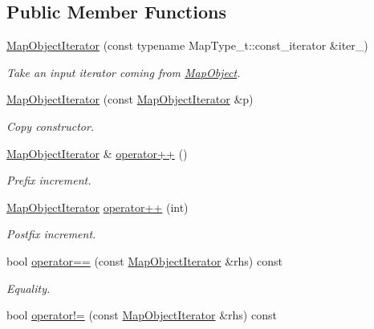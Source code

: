 \subsection*{Public Member Functions}
\begin{DoxyCompactItemize}
\item 
\mbox{\hyperlink{classADAT_1_1MapObjectIterator_a2b23220f6791a2793bb16a898a515926}{Map\+Object\+Iterator}} (const typename Map\+Type\+\_\+t\+::const\+\_\+iterator \&iter\+\_\+)
\begin{DoxyCompactList}\small\item\em Take an input iterator coming from \mbox{\hyperlink{classADAT_1_1MapObject}{Map\+Object}}. \end{DoxyCompactList}\item 
\mbox{\hyperlink{classADAT_1_1MapObjectIterator_a62eb4a3a1c1bab1329e51a3d857d4065}{Map\+Object\+Iterator}} (const \mbox{\hyperlink{classADAT_1_1MapObjectIterator}{Map\+Object\+Iterator}} \&p)
\begin{DoxyCompactList}\small\item\em Copy constructor. \end{DoxyCompactList}\item 
\mbox{\hyperlink{classADAT_1_1MapObjectIterator}{Map\+Object\+Iterator}} \& \mbox{\hyperlink{classADAT_1_1MapObjectIterator_a2eedaf3b2fc70d48afd45bd37c5e6e69}{operator++}} ()
\begin{DoxyCompactList}\small\item\em Prefix increment. \end{DoxyCompactList}\item 
\mbox{\hyperlink{classADAT_1_1MapObjectIterator}{Map\+Object\+Iterator}} \mbox{\hyperlink{classADAT_1_1MapObjectIterator_a90809a5488988dd0d49ce25df35756ae}{operator++}} (int)
\begin{DoxyCompactList}\small\item\em Postfix increment. \end{DoxyCompactList}\item 
bool \mbox{\hyperlink{classADAT_1_1MapObjectIterator_a3153929ca4103b625790fb1d09f33e71}{operator==}} (const \mbox{\hyperlink{classADAT_1_1MapObjectIterator}{Map\+Object\+Iterator}} \&rhs) const
\begin{DoxyCompactList}\small\item\em Equality. \end{DoxyCompactList}\item 
bool \mbox{\hyperlink{classADAT_1_1MapObjectIterator_a1110663c46b0e652d8ecd0dbe80bd255}{operator!=}} (const \mbox{\hyperlink{classADAT_1_1MapObjectIterator}{Map\+Object\+Iterator}} \&rhs) const

\end{DoxyCompactItemize}
